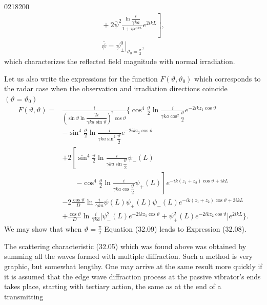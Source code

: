 \begin{scanpage}{0218}{200}
\[\begin{gathered}
\left.{}+2\bar\psi^2\frac{\ln\dfrac{i}{\gamma ka}}{1+\psi e^{ikL}}e^{2ikL}\right],\\
\bar\psi=\left.\psi_\pm^0\right|_{\vartheta_0=\frac\pi2},
\end{gathered}\tag{32.08}\]
which characterizes the reflected field magnitude with normal irradiation.

Let us also write the expressions for the function $F(\vartheta,\vartheta_0)$ which corresponds to the radar case when the observation and irradiation directions coincide $(\vartheta=\vartheta_0)$
\[\begin{aligned}
F(\vartheta,\vartheta)={}&\frac{i}{\left(\sin\vartheta\ln\dfrac{2i}{\gamma ka\sin\vartheta}\right)^2\cos\vartheta}\Biggl\{\cos^4\frac\vartheta2\ln\frac{i}{\gamma ka\cos^2\dfrac\vartheta2}e^{-2ikz_1\cos\vartheta}\\
&-\sin^4\frac\vartheta2\ln\frac{i}{\gamma ka\sin^2\dfrac\vartheta2}e^{-2ikz_2\cos\vartheta}\\
&+2\left[\sin^4\frac\vartheta2\ln\frac{i}{\gamma ka\sin\dfrac\vartheta2}\psi_-(L)\right.\\
&\qquad\left.-\cos^4\frac\vartheta2\ln\frac{i}{\gamma ka\cos\dfrac\vartheta2}\psi_+(L)\right]e^{-ik(z_1+z_2)\cos\vartheta+ikL}\\
&-2\frac{\cos\vartheta}D\ln\frac{i}{\gamma ka}\psi(L)\psi_+(L)\psi_-(L)e^{-ik(z_1+z_2)\cos\vartheta+3ikL}\\
&+\frac{\cos\vartheta}D\ln\frac{i}{\gamma ka}\bigl[\psi_-^2(L)e^{-2ikz_1\cos\vartheta}+\psi_+^2(L)e^{-2ikz_2\cos\vartheta}\bigr]e^{2ikL}\Biggr\}.
\end{aligned}\tag{32.09}\]
We may show that when $\vartheta=\frac\pi2$ Equation (32.09) leads to Expression (32.08).

The scattering characteristic (32.05) which was found above was obtained by summing all the waves formed with multiple diffraction. Such a method is very graphic, but somewhat lengthy. One may arrive at the same result more quickly if it is assumed that the edge wave diffraction process at the passive vibrator's ends takes place, starting with tertiary action, the same as at the end of a transmitting
\end{scanpage}
